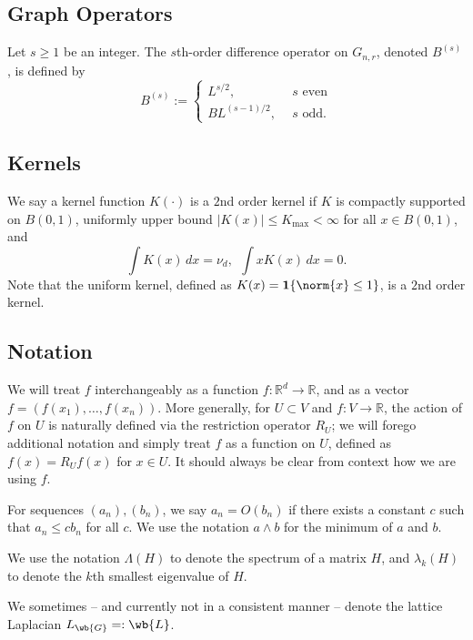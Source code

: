 \documentclass{article}
\newcommand{\Reals}{\mathbb{R}}
\newcommand{\abs}[1]{\left \lvert #1 \right \rvert}
\newcommand{\1}{\mathbf{1}}
\newcommand{\Rd}{\Reals^d}
\theoremstyle{alden}
\theoremstyle{aldenthm}
\theoremstyle{definition}
\theoremstyle{remark}
\begin{document}
\subsection{Graph Operators}
Let $s \geq 1$ be an integer. The $s$th-order difference operator on $G_{n,r}$, denoted $B^{(s)}$, is defined by
\begin{equation*}
B^{(s)} :=
\begin{cases}
L^{s/2},& ~~ s \textrm{ even} \\
BL^{(s - 1)/2},& ~~ s \textrm{ odd.}
\end{cases}
\end{equation*}

\subsection{Kernels}
We say a kernel function $K(\cdot)$ is a $2$nd order kernel if $K$ is compactly supported on $B(0,1)$, uniformly upper bound $\abs{K(x)} \leq K_{\max} < \infty$ for all $x \in B(0,1)$, and
\begin{equation*}
\int K(x) \,dx = \nu_d,~~ \int x K(x) \,dx = 0.
\end{equation*}
Note that the uniform kernel, defined as $K(x) = \1\{\norm{x} \leq 1\}$, is a $2$nd order kernel. 

\subsection{Notation}

We will treat $f$ interchangeably as a function $f:\Rd \to \Reals$, and as a vector $f = (f(x_1),\ldots,f(x_n))$. More generally, for $U \subset V$ and $f:V \to \Reals$, the action of $f$ on $U$ is naturally defined via the restriction operator $R_U$; we will forego additional notation and simply treat $f$ as a function on $U$, defined as $f(x) = R_Uf(x)$ for $x \in U$. It should always be clear from context how we are using $f$. 

For sequences $(a_n), (b_n)$, we say $a_n = O(b_n)$ if there exists a constant $c$ such that $a_n \leq cb_n$ for all $c$. We use the notation $a \wedge b$ for the minimum of $a$ and $b$.

We use the notation $\Lambda(H)$ to denote the spectrum of a matrix $H$, and $\lambda_k(H)$ to denote the $k$th smallest eigenvalue of $H$.

We sometimes -- and currently not in a consistent manner -- denote the lattice Laplacian $L_{\wb{G}} =: \wb{L}$. 
\end{document}
